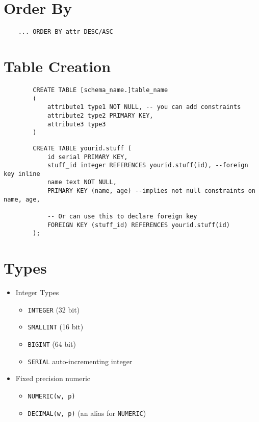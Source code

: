 \documentclass{cheatsheet}
\begin{document}
\begin{multicols*}{2}
    \section{Order By}
    \begin{verbatim}
    ... ORDER BY attr DESC/ASC
    \end{verbatim}

    \section{Table Creation}
    \begin{verbatim}
        CREATE TABLE [schema_name.]table_name
        (
            attribute1 type1 NOT NULL, -- you can add constraints
            attribute2 type2 PRIMARY KEY,
            attribute3 type3
        )
    \end{verbatim}
    \begin{verbatim}
        CREATE TABLE yourid.stuff (
            id serial PRIMARY KEY,
            stuff_id integer REFERENCES yourid.stuff(id), --foreign key inline
            name text NOT NULL,
            PRIMARY KEY (name, age) --implies not null constraints on name, age,

            -- Or can use this to declare foreign key
            FOREIGN KEY (stuff_id) REFERENCES yourid.stuff(id)
        );
    \end{verbatim}

    \section{Types}
    \begin{itemize}
        \item Integer Types
            \begin{itemize}
                \item \texttt{INTEGER} (32 bit)
                \item \texttt{SMALLINT} (16 bit)
                \item \texttt{BIGINT} (64 bit)
                \item \texttt{SERIAL} auto-incrementing integer
            \end{itemize}

        \item Fixed precision numeric
            \begin{itemize}
                \item \texttt{NUMERIC(w, p)}
                \item \texttt{DECIMAL(w, p)} (an alias for \texttt{NUMERIC})
            \end{itemize}


\end{itemize}
\end{multicols*}
\end{document}
